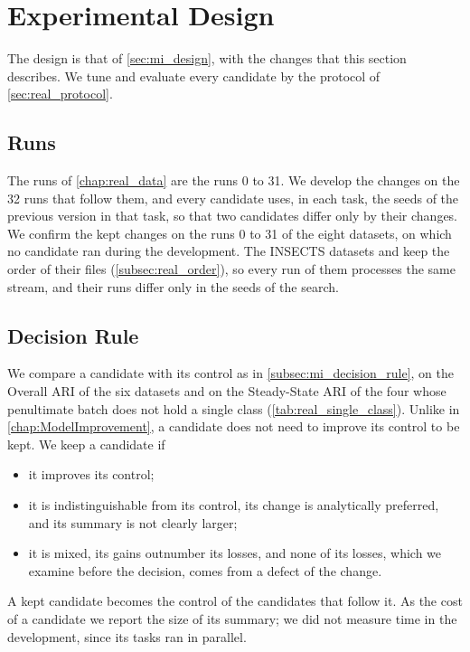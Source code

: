 \section{Experimental Design}
\label{sec:ri_design}

The design is that of \cref{sec:mi_design}, with the changes that this section describes. We tune and evaluate every candidate by the protocol of \cref{sec:real_protocol}.

\subsection{Runs}
\label{subsec:ri_runs}

The runs of \cref{chap:real_data} are the runs 0 to 31. We develop the changes on the 32 runs that follow them, and every candidate uses, in each task, the seeds of the previous \MicroTEDAClusPlus version in that task, so that two candidates differ only by their changes. We confirm the kept changes on the runs 0 to 31 of the eight datasets, on which no candidate ran during the development. The INSECTS datasets and \Covertype keep the order of their files (\cref{subsec:real_order}), so every run of them processes the same stream, and their runs differ only in the seeds of the search.

\subsection{Decision Rule}
\label{subsec:ri_decision_rule}

We compare a candidate with its control as in \cref{subsec:mi_decision_rule}, on the Overall ARI of the six datasets and on the Steady-State ARI of the four whose penultimate batch does not hold a single class (\cref{tab:real_single_class}). Unlike in \cref{chap:ModelImprovement}, a candidate does not need to improve its control to be kept. We keep a candidate if

\begin{itemize}
    \item it improves its control;
    \item it is indistinguishable from its control, its change is analytically preferred, and its summary is not clearly larger;
    \item it is mixed, its gains outnumber its losses, and none of its losses, which we examine before the decision, comes from a defect of the change.
\end{itemize}

A kept candidate becomes the control of the candidates that follow it. As the cost of a candidate we report the size of its summary; we did not measure time in the development, since its tasks ran in parallel.

